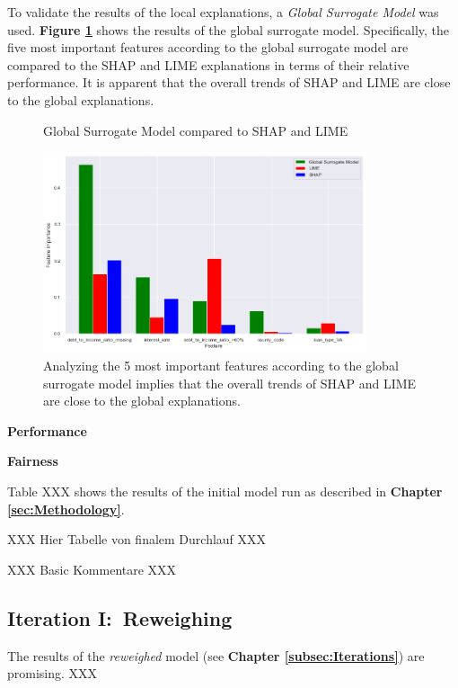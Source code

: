 To validate the results of the local explanations, a \textit{Global Surrogate Model} was used. \textbf{Figure \ref{fig:Global_Surrogate}} shows the results of the global surrogate model. Specifically, the five most important features according to the global surrogate model are compared to the SHAP and LIME explanations in terms of their relative performance.
It is apparent that the overall trends of SHAP and LIME are close to the global explanations.

\begin{figure}[h]
    \centering
    \caption{Global Surrogate Model compared to SHAP and LIME}
    \includegraphics[width=0.85\textwidth]{images/CHXX_UPDATE_Surrogate_SHAP_LIME_combined.png}
    \caption*{Analyzing the 5 most important features according to the global surrogate model implies that the overall trends of SHAP and LIME are close to the global explanations.}
    \label{fig:Global_Surrogate}
\end{figure}

\textbf{Performance}


\textbf{Fairness}


Table XXX shows the results of the initial model run as described in \textbf{Chapter \ref{sec:Methodology}}.

XXX Hier Tabelle von finalem Durchlauf XXX

XXX Basic Kommentare XXX

\subsection{Iteration I:\ Reweighing}\label{subsec:Iteration_I}

The results of the \textit{reweighed} model (see \textbf{Chapter \ref{subsec:Iterations}}) are promising. XXX

